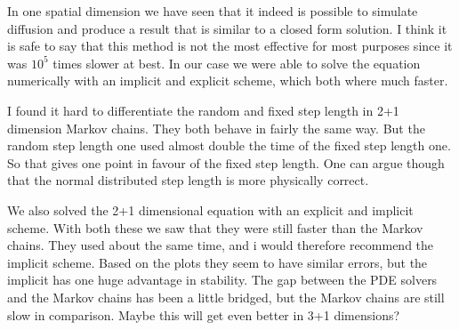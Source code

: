 \documentclass[english,a4paper,12pt]{article}
\begin{document}
In one spatial dimension we have seen that it indeed is possible to simulate diffusion and produce a result that is similar to
a closed form solution. I think it is safe to say that this method is not the most effective for most purposes since it was $10^5$ times slower at best.
In our case we were able to solve the equation numerically with an implicit and explicit scheme, which both where much faster.

I found it hard to differentiate the random and fixed step length in 2+1 dimension Markov chains. They both behave in fairly the same way.
But the random step length one used almost double the time of the fixed step length one. So that gives one point in favour of the
fixed step length. One can argue though that the normal distributed step length is more physically correct.

We also solved the 2+1 dimensional equation with an explicit and implicit scheme. With both these we saw that they were still faster
than the Markov chains. They used about the same time, and i would therefore recommend the implicit scheme. Based on the plots they
seem to have similar errors, but the implicit has one huge advantage in stability. The gap between the PDE solvers and the Markov chains
has been a little bridged, but the Markov chains are still slow in comparison. Maybe this will get even better in 3+1 dimensions?




%
\end{document}
